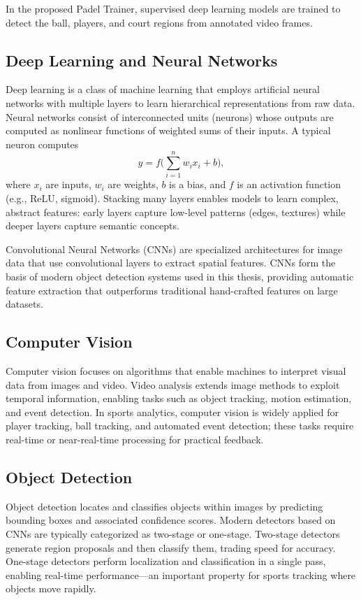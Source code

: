 In the proposed Padel Trainer, supervised deep learning models are trained to detect the ball, players, and court regions from annotated video frames.

\subsection{Deep Learning and Neural Networks}

Deep learning is a class of machine learning that employs artificial neural networks with multiple layers to learn hierarchical representations from raw data. Neural networks consist of interconnected units (neurons) whose outputs are computed as nonlinear functions of weighted sums of their inputs. A typical neuron computes
\[
y = f\Big(\sum_{i=1}^{n} w_i x_i + b\Big),
\]
where \(x_i\) are inputs, \(w_i\) are weights, \(b\) is a bias, and \(f\) is an activation function (e.g., ReLU, sigmoid). Stacking many layers enables models to learn complex, abstract features: early layers capture low-level patterns (edges, textures) while deeper layers capture semantic concepts.

Convolutional Neural Networks (CNNs) are specialized architectures for image data that use convolutional layers to extract spatial features. CNNs form the basis of modern object detection systems used in this thesis, providing automatic feature extraction that outperforms traditional hand-crafted features on large datasets.

\subsection{Computer Vision}

Computer vision focuses on algorithms that enable machines to interpret visual data from images and video. Video analysis extends image methods to exploit temporal information, enabling tasks such as object tracking, motion estimation, and event detection. In sports analytics, computer vision is widely applied for player tracking, ball tracking, and automated event detection; these tasks require real-time or near-real-time processing for practical feedback.

\subsection{Object Detection}

Object detection locates and classifies objects within images by predicting bounding boxes and associated confidence scores. Modern detectors based on CNNs are typically categorized as two-stage or one-stage. Two-stage detectors generate region proposals and then classify them, trading speed for accuracy. One-stage detectors perform localization and classification in a single pass, enabling real-time performance—an important property for sports tracking where objects move rapidly.

